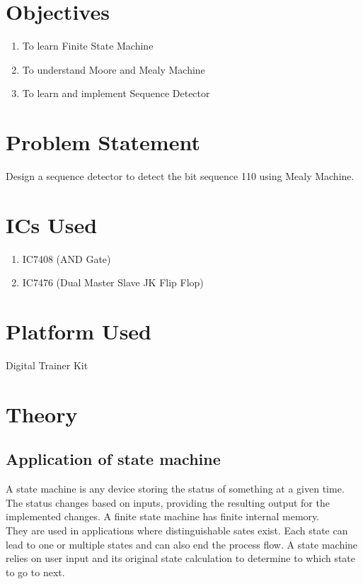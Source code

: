 \documentclass[11pt]{article}
\begin{document}
\tableofcontents
\thispagestyle{empty}
\clearpage


\setcounter{page}{1}
\section{Objectives}
\begin{enumerate}
	\item To learn Finite State Machine
	\item To understand Moore and Mealy Machine
	\item To learn and implement Sequence Detector


\end{enumerate}

\section{Problem Statement}
Design a sequence detector to detect the bit sequence 110 using Mealy Machine.


\section{ICs Used}

\begin{enumerate}
	\item IC7408 (AND Gate)
	\item IC7476 (Dual Master Slave JK Flip Flop)
\end{enumerate}

\section{Platform Used}
Digital Trainer Kit

\section{Theory}
\subsection{Application of state machine}

A state machine is any device storing the status of something at a given time. The status changes based on inputs, providing the resulting output for the implemented changes. A finite state machine has finite internal memory.\\

They are used in applications where distinguishable sates exist. Each state can lead to one or multiple states and can also end the process flow. A state machine relies on user input and its original state calculation to determine to which state to go to next.
\end{document}
